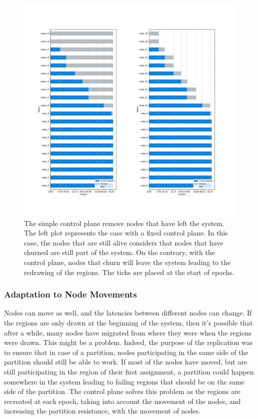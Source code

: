 \documentclass[a4paper,11pt,twoside=semi,openright]{report}
\begin{document}
\begin{figure}[!h] 
\centering
\includegraphics[width=450pt]{figures/ChurnSubplots}
\caption{The simple control plane remove nodes that have left the system. The
    left plot represents the case with a fixed control plane. In this case, the
    nodes that are still alive considers that nodes that have churned are still
    part of the system. On the contrary, with the control plane, nodes that
    churn will leave the system leading to the redrawing of the regions. The
    ticks are placed at the start of epochs.} \label{fig:churn-comparision}
\end{figure}

\subsubsection{Adaptation to Node Movements}
Nodes can move as well, and the latencies between different nodes can change.
If the regions are only drawn at the beginning of the system, then it's
possible that after a while, many nodes have migrated from where they were when
the regions were drawn. This might be a problem. Indeed, the purpose of the
replication was to ensure that in case of a partition, nodes participating in
the same side of the partition should still be able to work. If most of the
nodes have moved, but are still participating in the region of their first
assignment, a partition could happen somewhere in the system leading to failing
regions that should be on the same side of the partition. The control plane
solves this problem as the regions are recreated at each epoch, taking into
account the movement of the nodes, and increasing the partition resistance,
with the movement of nodes.
\end{document}
